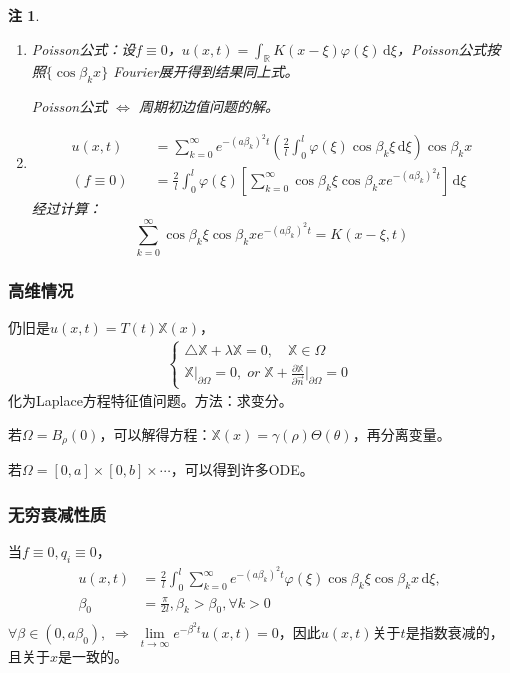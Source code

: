 \documentclass[11pt, a4paper]{article}
\theoremstyle{theorem}
\newtheorem*{note}{注}
\newcommand{\intd}[1]{\,\mathrm{d}{#1}}
\begin{document}
\begin{note}
\begin{enumerate}
  \item Poisson公式：设$f \equiv 0$，$u(x,t) = \int_{\mathbb{R}}K(x - \xi)\varphi(\xi) \intd \xi$，Poisson公式按照$\{\cos \beta_k x\}$ Fourier展开得到结果同上式。

  Poisson公式 $\Longleftrightarrow$ 周期初边值问题的解。

  \item
  \begin{align}
  \label{sol4-6}
      u(x,t) &= \sum_{k = 0}^\infty e^{-(a\beta_k)^2 t} \left(\frac{2}{l}\int_0^l \varphi(\xi)\cos \beta_k \xi \intd \xi \right) \cos \beta_k x \\
(f \equiv 0) \quad &= \frac{2}{l} \int_0^l \varphi(\xi) \left[\sum_{k=0}^\infty \cos \beta_k \xi \cos \beta_k x e^{-(a\beta_k)^2 t} \right] \intd \xi
  \end{align}
  经过计算：
  $$
  \sum_{k=0}^\infty \cos \beta_k \xi \cos \beta_k x e^{-(a\beta_k)^2 t} = K(x - \xi, t)
  $$
\end{enumerate}
\end{note}

\subsubsection{高维情况}

仍旧是$u(x,t) = T(t) \mathbb{X}(x)$，
\begin{align}
    \begin{cases}
      \triangle \mathbb{X} + \lambda \mathbb{X} = 0, \quad \mathbb{X} \in \Omega \\
      \mathbb{X} \bigg|_{\partial \Omega} = 0, \; or \; \mathbb{X} + \frac{\partial \mathbb{X}}{\partial \vec{n}} \bigg|_{\partial \Omega} = 0
    \end{cases}
\end{align}
化为Laplace方程特征值问题。方法：求变分。

若$\Omega = B_\rho(0)$，可以解得方程：$\mathbb{X}(x) = \gamma(\rho)\Theta(\theta)$，再分离变量。

若$\Omega = [0,a] \times [0,b] \times \cdots$，可以得到许多ODE。

\subsubsection{无穷衰减性质}

当$f \equiv 0, q_i \equiv 0$，
\begin{align*}
    u(x,t) &= \frac{2}{l} \int_0^l \sum_{k = 0}^\infty e^{-(a\beta_k)^2 t} \varphi(\xi)\cos \beta_k \xi \cos \beta_k x \intd \xi, \\
    \beta_0 &= \frac{\pi}{2 l}, \beta_k > \beta_0, \forall k > 0 \\\
\end{align*}
$\forall \beta \in (0, a \beta_0), \; \Rightarrow \; \lim\limits_{t \rightarrow \infty} e^{-\beta^2 t} u(x,t) = 0$，因此$u(x,t)$关于$t$是指数衰减的，且关于$x$是一致的。
\end{document}
